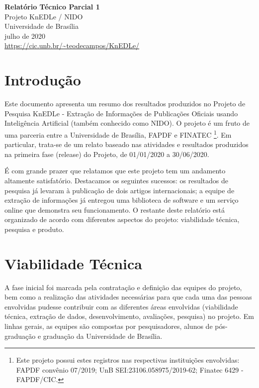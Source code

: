 \documentclass[12pt]{article}
\begin{document}
\begin{center}
{\Large \textbf{Relatório Técnico Parcial 1}}\\
{\large Projeto KnEDLe / NIDO}\\
{\large Universidade de Brasília}\\
{\large julho de 2020}\\
\url{https://cic.unb.br/~teodecampos/KnEDLe/}
\end{center}

\section{Introdução}
\label{sec:introducao}

Este documento apresenta um resumo dos resultados produzidos no Projeto de Pesquisa KnEDLe - Extração de Informações de Publicações Oficiais usando Inteligência Artificial (também conhecido como NIDO). O projeto é um fruto de uma parceria entre a Universidade de Brasília, FAPDF e FINATEC \footnote{Este projeto possui estes registros nas respectivas instituições envolvidas: FAPDF convênio 07/2019; UnB SEI:23106.058975/2019-62; Finatec 6429 - FAPDF/CIC.}. Em particular, trata-se de um relato baseado nas atividades e resultados produzidos na primeira fase (release) do Projeto, de 01/01/2020 a 30/06/2020. 

É com grande prazer que relatamos que este projeto tem um andamento altamente satisfatório. Destacamos os seguintes sucessos:
os resultados de pesquisa já levaram à publicação de dois artigos internacionais;
a equipe de extração de informações já entregou uma biblioteca de software e um serviço online que demonstra seu funcionamento.
O restante deste relatório está organizado de acordo com diferentes aspectos do projeto: viabilidade técnica, pesquisa e produto.

\section{Viabilidade Técnica}
\label{sec:viabilidade}

A fase inicial foi marcada pela contratação e definição das equipes do projeto, bem como a realização das atividades necessárias para que cada uma das pessoas envolvidas pudesse contribuir com as diferentes áreas envolvidas (viabilidade técnica, extração de dados, desenvolvimento, avaliações, pesquisa) no projeto. Em linhas gerais, as equipes são compostas por pesquisadores, alunos de pós-graduação e graduação da Universidade de Brasília.
\end{document}
